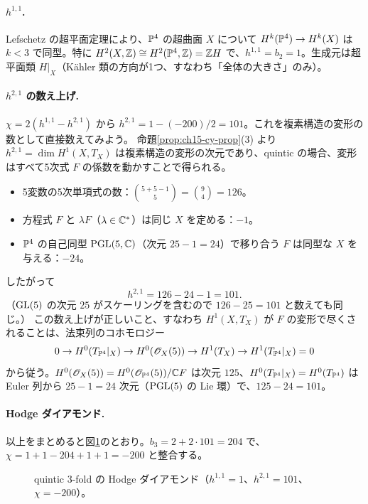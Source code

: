 \paragraph{$h^{1,1}$.}
Lefschetz の超平面定理により、$\mathbb{P}^4$ の超曲面 $X$ について $H^k(\mathbb{P}^4)\to H^k(X)$ は $k<3$ で同型。特に
$H^2(X,\mathbb{Z})\cong H^2(\mathbb{P}^4,\mathbb{Z}) = \mathbb{Z} H$ で、$h^{1,1} = b_2 = 1$。生成元は超平面類 $H|_X$（K\"ahler 類の方向が1つ、すなわち「全体の大きさ」のみ）。

\paragraph{$h^{2,1}$ の数え上げ.}
$\chi = 2(h^{1,1}-h^{2,1})$ から $h^{2,1} = 1 - (-200)/2 = 101$。これを複素構造の変形の数として直接数えてみよう。
命題\ref{prop:ch15-cy-prop}(3) より $h^{2,1} = \dim H^1(X,T_X)$ は複素構造の変形の次元であり、quintic の場合、変形はすべて5次式 $F$ の係数を動かすことで得られる。
\begin{itemize}
\item 5変数の5次単項式の数：$\binom{5+5-1}{5} = \binom{9}{4} = 126$。
\item 方程式 $F$ と $\lambda F$（$\lambda\in\mathbb{C}^*$）は同じ $X$ を定める：$-1$。
\item $\mathbb{P}^4$ の自己同型 $\operatorname{PGL}(5,\mathbb{C})$（次元 $25-1 = 24$）で移り合う $F$ は同型な $X$ を与える：$-24$。
\end{itemize}
したがって
\[
h^{2,1} = 126 - 24 - 1 = 101 .
\]
（$\operatorname{GL}(5)$ の次元 $25$ がスケーリングを含むので $126-25 = 101$ と数えても同じ。）
この数え上げが正しいこと、すなわち $H^1(X,T_X)$ が $F$ の変形で尽くされることは、法束列のコホモロジー
\[
0\to H^0(T_{\mathbb{P}^4}|_X)\to H^0(\mathscr{O}_X(5))\to H^1(T_X)\to H^1(T_{\mathbb{P}^4}|_X) = 0
\]
から従う。$H^0(\mathscr{O}_X(5)) = H^0(\mathscr{O}_{\mathbb{P}^4}(5))/\mathbb{C} F$ は次元 $125$、$H^0(T_{\mathbb{P}^4}|_X) = H^0(T_{\mathbb{P}^4})$ は Euler 列から $25-1=24$ 次元（$\operatorname{PGL}(5)$ の Lie 環）で、$125-24 = 101$。

\paragraph{Hodge ダイアモンド.}
以上をまとめると図\ref{fig:ch15-hodge-quintic}のとおり。$b_3 = 2+2\cdot101 = 204$ で、$\chi = 1 + 1 - 204 + 1 + 1 = -200$ と整合する。

\begin{figure}[H]
\centering
{}
\caption{quintic 3-fold の Hodge ダイアモンド（$h^{1,1}=1$、$h^{2,1}=101$、$\chi=-200$）。}
\label{fig:ch15-hodge-quintic}
\end{figure}


